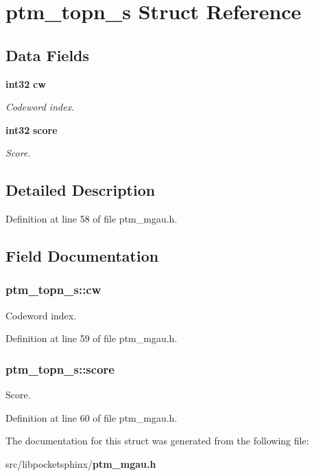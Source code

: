 \section{ptm\-\_\-topn\-\_\-s \-Struct \-Reference}
\label{structptm__topn__s}
\subsection*{\-Data \-Fields}
\begin{DoxyCompactItemize}
\item 
{\bf int32} {\bf cw}
\begin{DoxyCompactList}\small\item\em \-Codeword index. \end{DoxyCompactList}\item 
{\bf int32} {\bf score}
\begin{DoxyCompactList}\small\item\em \-Score. \end{DoxyCompactList}\end{DoxyCompactItemize}


\subsection{\-Detailed \-Description}


\-Definition at line 58 of file ptm\-\_\-mgau.\-h.



\subsection{\-Field \-Documentation}
\subsubsection[{cw}]{ {\bf ptm\-\_\-topn\-\_\-s\-::cw}}\label{structptm__topn__s_a8a46095488efefa2714214a7a74117b1}


\-Codeword index. 



\-Definition at line 59 of file ptm\-\_\-mgau.\-h.

\subsubsection[{score}]{ {\bf ptm\-\_\-topn\-\_\-s\-::score}}\label{structptm__topn__s_aa2080ad2d4f038cdbfbf46bf90884f56}


\-Score. 



\-Definition at line 60 of file ptm\-\_\-mgau.\-h.



\-The documentation for this struct was generated from the following file\-:\begin{DoxyCompactItemize}
\item 
src/libpocketsphinx/{\bf ptm\-\_\-mgau.\-h}\end{DoxyCompactItemize}
